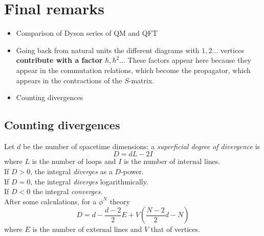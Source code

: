 
\section{Final remarks}
\begin{itemize}
    \item Comparison of Dyson series of QM and QFT
    \item Going back from natural units the different diagrams with $1, 2...$
        vertices \textbf{contribute with a factor} $\hbar,\hbar^2...$
        These factors appear here because they appear in the commutation
        relations, which become the propagator, which appears in the contractions
        of the $S$-matrix.
    \item Counting divergences
\end{itemize}
\subsection{Counting divergences}
Let $d$ be the number of spacetime dimensions: a \textit{superficial degree of
divergence} is
$$D = dL-2I$$
where $L$ is the number of loops and $I$ is the number of internal lines.\\
If $D>0$, the integral \textit{diverges} as a $D$-power.\\
If $D = 0$, the integral \textit{diverges} logarithmically.\\
If $D<0$ the integral \textit{converges}.\\
After some calculations, for a $\phi^N$ theory
$$D = d-\frac{d-2}{2}E +V\left(\frac{N-2}{2}d-N\right)$$
where $E$ is the number of external lines and $V$ that of vertices.
